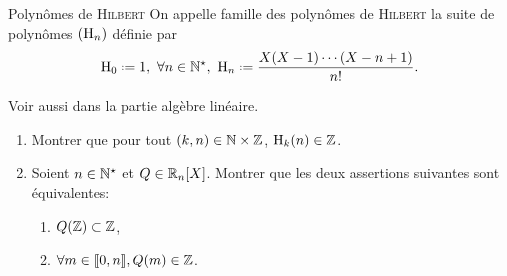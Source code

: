 \begin{defi}{Polynômes de \textsc{Hilbert}}
    On appelle famille des polynômes de \textsc{Hilbert} la suite de polynômes $(\mathrm{H}_n)$ définie par
    $$\Hilb_0 \defeq 1,\ \forall n \in \Ne,\ \Hilb_n \defeq \frac{X(X-1)\cdots(X-n+1)}{n!}.$$
\end{defi}

Voir aussi  dans la partie algèbre linéaire. 

\begin{exercice}
    \begin{enumerate}
        \item Montrer que pour tout $(k, n) \in \mathbb{N} \times \mathbb{Z}$, $\mathrm{H}_k(n) \in \mathbb{Z}$.
        \item Soient $n \in \mathbb{N}^\star$ et $Q \in \mathbb{R}_n[X]$. Montrer que les deux assertions suivantes sont équivalentes:
        \begin{enumerate}[label=(\roman*)]
            \item $Q(\mathbb{Z}) \subset \mathbb{Z}$,
            \item $\forall m \in \llbracket 0, n \rrbracket, Q(m) \in \mathbb{Z}$.
        \end{enumerate}
    \end{enumerate}
\end{exercice}